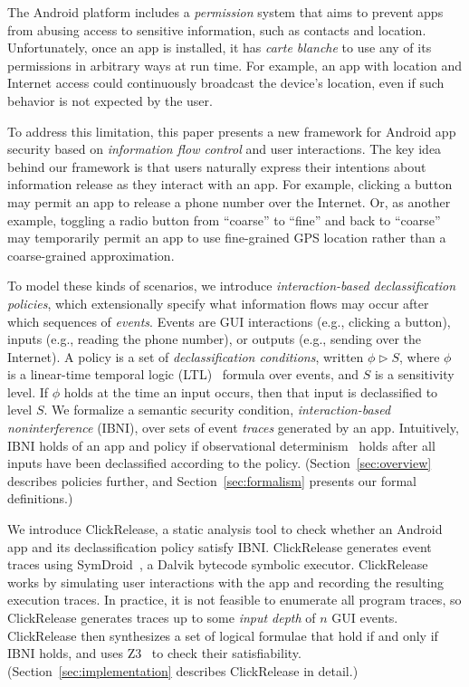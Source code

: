 \documentclass{llncs}
\newcommand{\toolname}{ClickRelease\xspace}
\begin{document}
The Android platform includes a \emph{permission} system that aims to
prevent apps from abusing access to sensitive information, such as
contacts and location. Unfortunately, once an app is installed, it has
\emph{carte blanche} to use any of its permissions in arbitrary ways
at run time. For example, an app with location and Internet access
could continuously broadcast the device's location, even if such
behavior is not expected by the user.

To address this limitation, this paper presents a new framework for
Android app security based on \emph{information flow control}
\cite{Denning:1975} and user interactions.  The key idea behind our framework
is that users naturally express their intentions about information
release as they interact with an app.  For example,
clicking a button may permit an app to release a phone number over the
Internet. Or, as another example,
toggling a radio button from ``coarse'' to ``fine'' and back to
  ``coarse'' may temporarily permit an app to use fine-grained GPS
  location rather than a coarse-grained approximation.

To model these kinds of scenarios, we introduce
\emph{interaction-based declassification policies}, which
extensionally specify what information flows may occur after which
sequences of \emph{events}.  Events are GUI interactions (e.g.,
clicking a button), inputs (e.g., reading
the phone number), or outputs (e.g., sending over the Internet).
A policy is a set of \emph{declassification conditions}, written
$\phi \mathrel\rhd S$, where $\phi$ is a linear-time temporal logic
(LTL)~\cite{Pnueli:1977} formula over events, and $S$ is a sensitivity
level.  If $\phi$ holds at the time an input occurs, then that input
is declassified to level $S$. 
We formalize a semantic security condition,
\emph{interaction-based noninterference} (IBNI), over sets of event
\emph{traces} generated by an app.  Intuitively, IBNI holds of an app
and policy if observational
determinism~\cite{Zdancewic:03} holds after all inputs have been
declassified according to the policy. 
(Section~\ref{sec:overview}
describes policies further, and Section~\ref{sec:formalism} presents
our formal definitions.)

We introduce \toolname, a static analysis tool to check
whether an Android app and its declassification policy
satisfy IBNI.
\toolname generates event traces using SymDroid~\cite{Jeon:2012}, a
Dalvik bytecode symbolic executor.  \toolname
works by simulating user interactions with the app and recording the
resulting execution traces.
In practice, it is not feasible to
enumerate all program traces, so \toolname generates traces up to some
\emph{input depth} of $n$ GUI events.  
\toolname{} then synthesizes a
set of logical formulae that hold if and only if IBNI holds, and uses
Z3~\cite{deMoura:2008} to check their satisfiability.
(Section~\ref{sec:implementation} describes \toolname in detail.)
\end{document}
